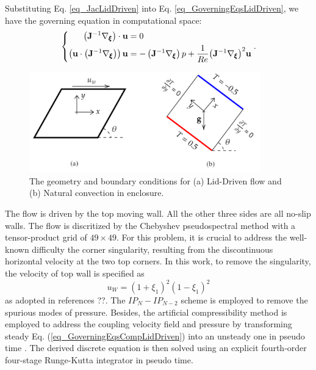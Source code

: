 \documentclass[preprint, 10pt]{elsarticle}
\begin{document}
Substituting Eq. \ref{eq_JacLidDriven} into Eq. \ref {eq_GoverningEqsLidDriven}, we have the governing equation in computational space:
\begin{equation}
\left \{
\begin{aligned}
\left(\mathbf{J}^{-1} \nabla_{\pmb {\xi}}\right)  \cdot {\bf{u}} &= 0 \\
\left( {{\bf{u}} \cdot \left(\mathbf{J}^{-1} \nabla_{\pmb {\xi}}\right) } \right){\bf{u}} &=  - \left(\mathbf{J}^{-1} \nabla_{\pmb {\xi}}\right) p + \frac{1}{Re}{\left(\mathbf{J}^{-1} \nabla_{\pmb {\xi}}\right) ^2}{\bf{u}}
\end{aligned}
\right .
.
\label{eq_GoverningEqsCompLidDriven}
\end{equation}


\begin{figure}[!ht]
    \centering
    \includegraphics[width=10cm]{..//fig/geometry.pdf}
    \caption{The geometry and boundary conditions for (a) Lid-Driven flow and (b) Natural convection in enclosure.}
    \label{fig_geometry}
\end{figure}


The flow is driven by the top moving wall. All the other three sides are all no-slip walls. The flow is discritized by the Chebyshev pseudospectral method with a tensor-product grid of $49 \times 49$.
For this problem, it is crucial to address the well-known difficulty the corner singularity, resulting from the discontinuous horizontal velocity at the two top corners. In this work, to remove the singularity, the velocity of top wall is specified as
\begin{equation}
u_W = (1+\xi_1)^2(1-\xi_1)^2
\end{equation}
as adopted in references ??. The $IP_{N}-IP_{N-2}$ scheme is employed to remove the spurious modes of pressure.
Besides, the artificial compressibility method is employed to address the coupling velocity field and pressure by  transforming steady  Eq. (\ref{eq_GoverningEqsCompLidDriven}) into an unsteady one in pseudo time . The derived discrete equation is then solved using an explicit fourth-order four-stage Runge-Kutta integrator in pseudo time.
\end{document}
